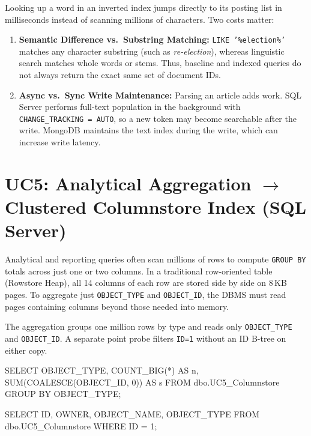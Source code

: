 Looking up a word in an inverted index jumps directly to its posting list in milliseconds instead of scanning millions of characters. 
Two costs matter:
\begin{enumerate}
\item \textbf{Semantic Difference vs.\ Substring Matching:} \texttt{LIKE '\%election\%'} matches any character substring (such as \emph{re-election}), whereas linguistic search matches whole words or stems. Thus, baseline and indexed queries do not always return the exact same set of document IDs.
\item \textbf{Async vs.\ Sync Write Maintenance:} Parsing an article adds work. SQL Server performs full-text population in the background with \texttt{CHANGE\_TRACKING = AUTO}, so a new token may become searchable after the write. MongoDB maintains the text index during the write, which can increase write latency.
\end{enumerate}



\UCFourDiagram

\section{UC5: Analytical Aggregation \texorpdfstring{$\rightarrow$}{->} Clustered Columnstore Index (SQL Server)}

Analytical and reporting queries often scan millions of rows to compute \texttt{GROUP BY} totals across just one or two columns. In a traditional row-oriented table (Rowstore Heap), all 14 columns of each row are stored side by side on 8\,KB pages. To aggregate just \texttt{OBJECT\_TYPE} and \texttt{OBJECT\_ID}, the DBMS must read pages containing columns beyond those needed into memory.

The aggregation groups one million rows by type and reads only \texttt{OBJECT\_TYPE} and \texttt{OBJECT\_ID}. A separate point probe filters \texttt{ID=1} without an ID B-tree on either copy.
\begin{SQLCode}
SELECT OBJECT_TYPE, COUNT_BIG(*) AS n,
       SUM(COALESCE(OBJECT_ID, 0)) AS s
FROM dbo.UC5_Columnstore GROUP BY OBJECT_TYPE;

SELECT ID, OWNER, OBJECT_NAME, OBJECT_TYPE
FROM dbo.UC5_Columnstore WHERE ID = 1;
\end{SQLCode}

